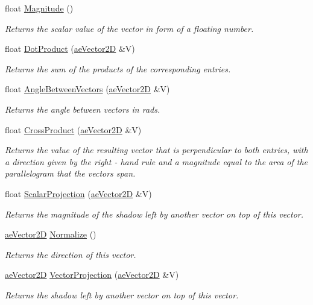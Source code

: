 \begin{DoxyCompactItemize}
\item 
float \hyperlink{structae_core_1_1ae_vector2_d_a62f798126471c7cbea18edbd6bd3cd63}{Magnitude} ()
\begin{DoxyCompactList}\small\item\em Returns the scalar value of the vector in form of a floating number. \end{DoxyCompactList}\item 
float \hyperlink{structae_core_1_1ae_vector2_d_a888db8bd58bde561d4c17e1e1a34b943}{Dot\+Product} (\hyperlink{structae_core_1_1ae_vector2_d}{ae\+Vector2D} \&V)
\begin{DoxyCompactList}\small\item\em Returns the sum of the products of the corresponding entries. \end{DoxyCompactList}\item 
float \hyperlink{structae_core_1_1ae_vector2_d_aeb43a0c97e2025b92a1fc4ef868b5362}{Angle\+Between\+Vectors} (\hyperlink{structae_core_1_1ae_vector2_d}{ae\+Vector2D} \&V)
\begin{DoxyCompactList}\small\item\em Returns the angle between vectors in rads. \end{DoxyCompactList}\item 
float \hyperlink{structae_core_1_1ae_vector2_d_a5307f2bfd34625fb6cd9b1251b43f883}{Cross\+Product} (\hyperlink{structae_core_1_1ae_vector2_d}{ae\+Vector2D} \&V)
\begin{DoxyCompactList}\small\item\em Returns the value of the resulting vector that is perpendicular to both entries, with a direction given by the right -\/ hand rule and a magnitude equal to the area of the parallelogram that the vectors span. \end{DoxyCompactList}\item 
float \hyperlink{structae_core_1_1ae_vector2_d_a386b873d4c9ef5fe954496138d0136d4}{Scalar\+Projection} (\hyperlink{structae_core_1_1ae_vector2_d}{ae\+Vector2D} \&V)
\begin{DoxyCompactList}\small\item\em Returns the magnitude of the shadow left by another vector on top of this vector. \end{DoxyCompactList}\item 
\hyperlink{structae_core_1_1ae_vector2_d}{ae\+Vector2D} \hyperlink{structae_core_1_1ae_vector2_d_a1c07cd29be7768366a5637722ab58f04}{Normalize} ()
\begin{DoxyCompactList}\small\item\em Returns the direction of this vector. \end{DoxyCompactList}\item 
\hyperlink{structae_core_1_1ae_vector2_d}{ae\+Vector2D} \hyperlink{structae_core_1_1ae_vector2_d_a3dbf9d95c379167dc5627a3efcc875ac}{Vector\+Projection} (\hyperlink{structae_core_1_1ae_vector2_d}{ae\+Vector2D} \&V)
\begin{DoxyCompactList}\small\item\em Returns the shadow left by another vector on top of this vector. \end{DoxyCompactList}\end{DoxyCompactItemize}
